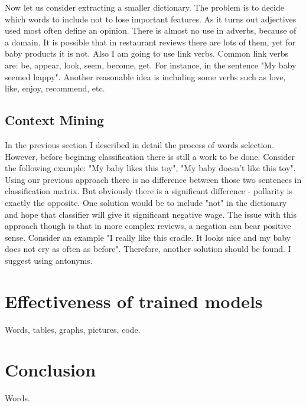 \documentclass[12pt]{report}
\begin{document}
Now let us consider extracting a smaller dictionary. The problem is to decide which words to include not to lose important features. As it turns out adjectives used most often define an opinion. There is almost no use in adverbs, because of a domain. It is possible that in restaurant reviews there are lots of them, yet for baby products it is not.  Also I am going to use link verbs. Common link verbs are: be, appear, look, seem, become, get. For instance, in the sentence "My baby seemed happy". Another reasonable idea is including some verbs such as love, like, enjoy, recommend, etc.


\newpage

\section{Context Mining}

In the previous section I described in detail the process of words selection. However, before begining classification there is still a work to be done. Consider the following example: "My baby likes this toy", "My baby doesn't like this toy". Using our previous approach there is no difference between those two sentences in classification matrix. But obviously there is a significant difference - pollarity is exactly the opposite. One solution would be to include "not" in the dictionary and hope that classifier will give it significant negative wage. The issue with this approach though is that in more complex reviews, a negation can bear positive sense. Consider an example "I really like this cradle. It looks nice and my baby does not cry as often as before". Therefore, another solution should be found. I suggest using antonyms.

\newpage

\chapter{Effectiveness of trained models}

Words, tables, graphs, pictures, code.

\newpage

\chapter*{Conclusion}

Words.

\newpage

\end{document}
